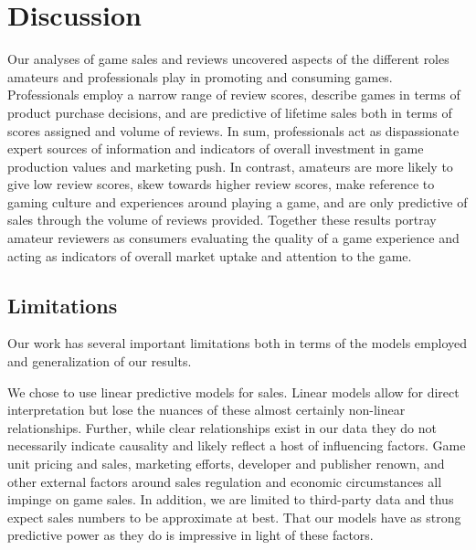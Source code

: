 \documentclass[letterpaper]{article}
\begin{document}
\section{Discussion}
Our analyses of game sales and reviews uncovered aspects of the different roles amateurs and professionals play in promoting and consuming games. Professionals employ a narrow range of review scores, describe games in terms of product purchase decisions, and are predictive of lifetime sales both in terms of scores assigned and volume of reviews. In sum, professionals act as dispassionate expert sources of information and indicators of overall investment in game production values and marketing push. In contrast, amateurs are more likely to give low review scores, skew towards higher review scores, make reference to gaming culture and experiences around playing a game, and are only predictive of sales through the volume of reviews provided. Together these results portray amateur reviewers as consumers evaluating the quality of a game experience and acting as indicators of overall market uptake and attention to the game.


\subsection{Limitations}
Our work has several important limitations both in terms of the models employed and generalization of our results.

We chose to use linear predictive models for sales. Linear models allow for direct interpretation but lose the nuances of these almost certainly non-linear relationships. Further, while clear relationships exist in our data they do not necessarily indicate causality and likely reflect a host of influencing factors. Game unit pricing and sales, marketing efforts, developer and publisher renown, and other external factors around sales regulation and economic circumstances all impinge on game sales. In addition, we are limited to third-party data and thus expect sales numbers to be approximate at best. That our models have as strong predictive power as they do is impressive in light of these factors.
\end{document}
